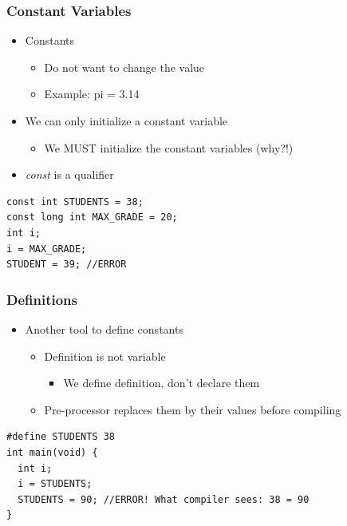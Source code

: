 \documentclass{../c-lecture}
\begin{document}
\begin{frame}[fragile]
  \frametitle{Constant Variables}
  \begin{itemize}
    \item Constants
    \begin{itemize}
      \item Do not want to change the value
      \item Example: pi = 3.14
    \end{itemize}
    \item We can only initialize a constant variable
    \begin{itemize}
      \item We MUST initialize the constant variables (why?!)
    \end{itemize}
    \item \textit{\color{LimeGreen} const} is a qualifier
  \end{itemize}
  \begin{verbatim}
const int STUDENTS = 38;
const long int MAX_GRADE = 20;
int i;
i = MAX_GRADE;
STUDENT = 39; //ERROR
  \end{verbatim}
\end{frame}

\begin{frame}[fragile]
  \frametitle{Definitions}
  \begin{itemize}
    \item Another tool to define constants
    \begin{itemize}
      \item Definition is not variable
      \begin{itemize}
        \item We define definition, don’t declare them
      \end{itemize}
      \item Pre-processor replaces them by their values before compiling
    \end{itemize}
  \end{itemize}
  \begin{verbatim}
#define STUDENTS 38
int main(void) {
  int i;
  i = STUDENTS;
  STUDENTS = 90; //ERROR! What compiler sees: 38 = 90
}
  \end{verbatim}
\end{frame}
\end{document}
